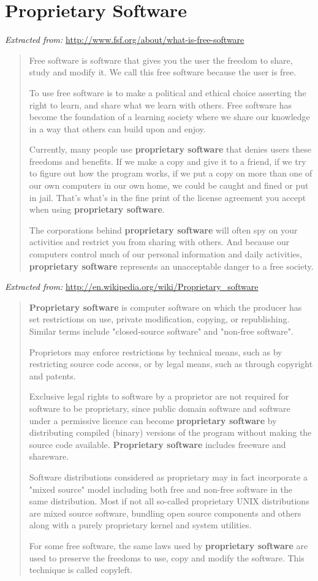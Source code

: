 \section{Proprietary Software}
\emph{Extracted from:} \url{http://www.fsf.org/about/what-is-free-software}
\begin{quote}
Free software is software that gives you the user the freedom to share, study and modify it. We call this free software because the user is free.

To use free software is to make a political and ethical choice asserting the right to learn, and share what we learn with others.  Free software has become the foundation of a learning society where we share our knowledge in a way that others can build upon and enjoy.

Currently, many people use \textbf{proprietary software} that denies users these freedoms and benefits.  If we make a copy and give it to a friend, if we try to figure out how the program works, if we put a copy on more than one of our own computers in our own home, we could be caught and fined or put in jail. That’s what’s in the fine print of the license agreement you accept when using \textbf{proprietary software}.

The corporations behind \textbf{proprietary software} will often spy on your activities and restrict you from sharing with others. And because our computers control much of our personal information and daily activities, \textbf{proprietary software} represents an unacceptable danger to a free society.
\end{quote}

\emph{Extracted from:} \url{http://en.wikipedia.org/wiki/Proprietary_software}
\begin{quote}
\textbf{Proprietary software} is computer software on which the producer has set restrictions on use, private modification, copying, or republishing. Similar terms include "closed-source software" and "non-free software".

Proprietors may enforce restrictions by technical means, such as by restricting source code access, or by legal means, such as through copyright and patents.

Exclusive legal rights to software by a proprietor are not required for software to be proprietary, since public domain software and software under a permissive licence can become \textbf{proprietary software} by distributing compiled (binary) versions of the program without making the source code available. \textbf{Proprietary software} includes freeware and shareware.

Software distributions considered as proprietary may in fact incorporate a "mixed source" model including both free and non-free software in the same distribution. Most if not all so-called proprietary UNIX distributions are mixed source software, bundling open source components and others along with a purely proprietary kernel and system utilities.

For some free software, the same laws used by \textbf{proprietary software} are used to preserve the freedoms to use, copy and modify the software. This technique is called copyleft.
\end{quote}
